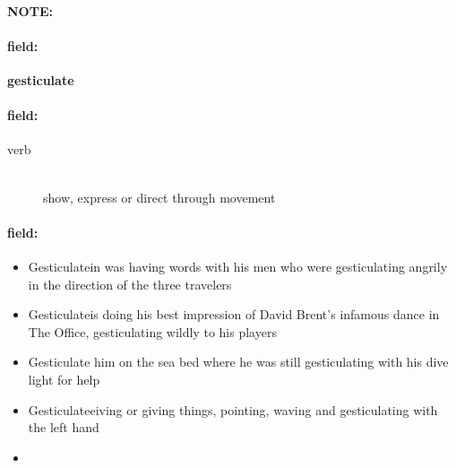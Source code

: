\documentclass[12pt]{article}
\newenvironment{note}{\paragraph{NOTE:}}{}
\newenvironment{field}{\paragraph{field:}}{}
\begin{document}
\begin{note}
\begin{field}
\textbf{\large gesticulate}
\end{field}


\begin{field}
\begin{description}
\item[verb] \hfill \\ 
show, express or direct through movement

\end{description}
\end{field}

\begin{field}
\begin{itemize}
\item Gesticulatein was having words with his men who were gesticulating angrily in the direction of the three travelers
\item Gesticulateis doing his best impression of David Brent's infamous dance in The Office, gesticulating wildly to his players
\item Gesticulate him on the sea bed where he was still gesticulating with his dive light for help
\item Gesticulateeiving or giving things, pointing, waving and gesticulating with the left hand
\item 
\end{itemize}
\end{field}
\end{note}
\end{document}
